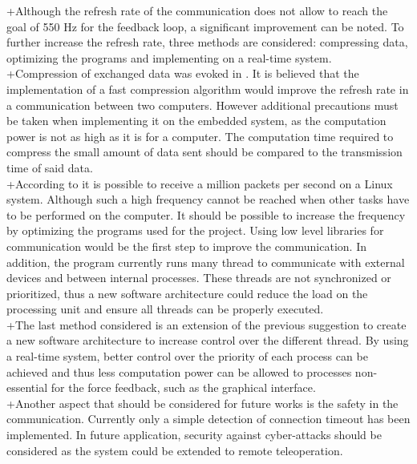 +Although the refresh rate of the communication does not allow to reach the goal of 550 Hz for the feedback loop, a significant improvement can be noted.  To further increase the refresh rate, three methods are considered: compressing data, optimizing the programs and implementing on a real-time system.\\
 +Compression of exchanged data was evoked in . It is believed that the implementation of a fast compression algorithm would improve the refresh rate in a communication between two computers. However additional precautions must be taken when implementing it on the embedded system, as the computation power is not as high as it is for a computer. The computation time required to compress the small amount of data sent should be compared to the transmission time of said data.\\
 +According to \cite{million_packets} it is possible to receive a million packets per second on a Linux system. Although such a high frequency cannot be reached when other tasks have to be performed on the computer. It should be possible to increase the frequency by optimizing the programs used for the project. Using low level libraries for communication would be the first step to improve the communication. In addition, the program currently runs many thread to communicate with external devices and between internal processes. These threads are not synchronized or prioritized, thus a new software architecture could reduce the load on the processing unit and ensure all threads can be properly executed.\\
 +The last method considered is an extension of the previous suggestion to create a new software architecture to increase control over the different thread. By using a real-time system, better control over the priority of each process can be achieved and thus less computation power can be allowed to processes non-essential for the force feedback, such as the graphical interface.\\
 +Another aspect that should be considered for future works is the safety in the communication. Currently only a simple detection of connection timeout has been implemented. In future application, security against cyber-attacks should be considered as the system could be extended to remote teleoperation.